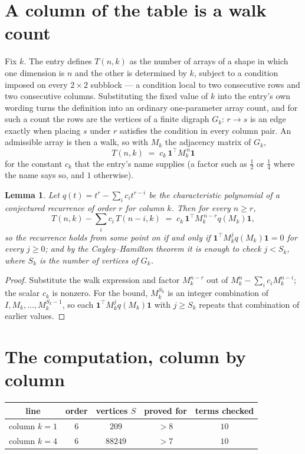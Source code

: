 \documentclass[11pt,a4paper]{article}
\theoremstyle{plain}
\newtheorem{lemma}[theorem]{Lemma}
\theoremstyle{definition}
\begin{document}
\section{A column of the table is a walk count}

Fix $k$. The entry defines $T(n,k)$ as the number of arrays of a shape in which one dimension
is $n$ and the other is determined by $k$, subject to a condition imposed on every
$2\times2$ subblock --- a condition local to two consecutive rows and two consecutive columns.
Substituting the fixed value of $k$ into the entry's own wording turns the definition into an
ordinary one-parameter array count, and for such a count the rows are the vertices of a finite
digraph $G_k$: $r\to s$ is an edge exactly when placing $s$ under $r$ satisfies the condition
in every column pair. An admissible array is then a walk, so with $M_k$ the adjacency matrix
of $G_k$,
\[
T(n,k)\;=\;c_k\,\mathbf{1}^{\!\top}M_k^{\,n}\mathbf{1}
\]
for the constant $c_k$ that the entry's name supplies (a factor such as $\tfrac12$ or
$\tfrac14$ where the name says so, and $1$ otherwise).

\begin{lemma}\label{lem:crit}
Let $q(t)=t^{r}-\sum_i c_it^{r-i}$ be the characteristic polynomial of a conjectured
recurrence of order $r$ for column $k$. Then for every $n\ge r$,
\[
T(n,k)-\sum_i c_i\,T(n-i,k)\;=\;c_k\,\mathbf{1}^{\!\top}M_k^{\,n-r}q(M_k)\mathbf{1},
\]
so the recurrence holds from some point on if and only if
$\mathbf{1}^{\!\top}M_k^{j}q(M_k)\mathbf{1}=0$ for every $j\ge0$; and by the
Cayley--Hamilton theorem it is enough to check $j<S_k$, where $S_k$ is the number of vertices
of $G_k$.
\end{lemma}

\begin{proof}
Substitute the walk expression and factor $M_k^{n-r}$ out of $M_k^{n}-\sum_ic_iM_k^{n-i}$;
the scalar $c_k$ is nonzero. For the bound, $M_k^{S_k}$ is an integer combination of
$I,M_k,\dots,M_k^{S_k-1}$, so each $\mathbf{1}^{\!\top}M_k^{j}q(M_k)\mathbf{1}$ with
$j\ge S_k$ repeats that combination of earlier values.
\end{proof}

\section{The computation, column by column}

\begin{center}
\begin{tabular}{ccccc}
line & order & vertices $S$ & proved for & terms checked \\ \hline
column $k$$=1$ & $6$ & $209$ & $>8$ & $10$ \\
column $k$$=4$ & $6$ & $88249$ & $>7$ & $10$ \\
\end{tabular}
\end{center}
\end{document}
